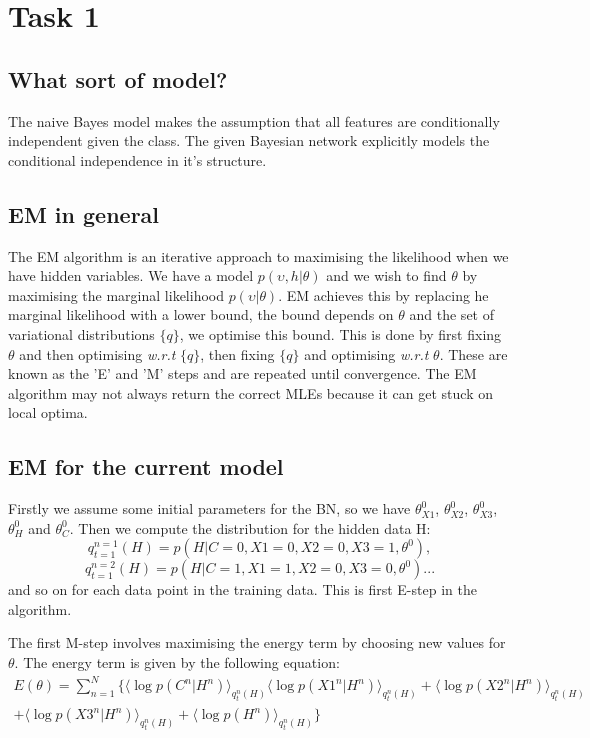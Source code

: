 \documentclass[12pt]{article} %
\begin{document}
\section{Task 1} %


\subsection{What sort of model?} %
The naive Bayes model makes the assumption that all features are conditionally independent given the class. The given Bayesian network explicitly models the conditional independence in it's structure.

\subsection{EM in general}
The EM algorithm is an iterative approach to maximising the likelihood when we have hidden variables. We have a model $p(\upsilon,h|\theta)$ and we wish to find $\theta$ by maximising the marginal likelihood $p(\upsilon|\theta)$. EM achieves this by replacing he marginal likelihood with a lower bound, the bound depends on $\theta$ and the set of variational distributions $\{q\}$, we optimise this bound. This is done by first fixing $\theta$ and then optimising \textit{w.r.t} $\{q\}$, then fixing $\{q\}$ and optimising \textit{w.r.t} $\theta$. These are known as the 'E' and 'M' steps and are repeated until convergence. The EM algorithm may not always return the correct MLEs because it can get stuck on local optima.

\subsection{EM for the current model}
Firstly we assume some initial parameters for the BN, so we have $\theta_{X1}^0$, $\theta_{X2}^0$, $\theta_{X3}^0$, $\theta_{H}^0$ and $\theta_{C}^0$. Then we compute the distribution for the hidden data H:
$$
q_{t=1}^{n=1}(H)=p(H|C=0,X1=0,X2=0,X3=1,\theta^0),
$$
$$
q_{t=1}^{n=2}(H)=p(H|C=1,X1=1,X2=0,X3=0,\theta^0)...
$$
and so on for each data point in the training data. This is first E-step in the algorithm.

The first M-step involves maximising the energy term by choosing new values for $\theta$. The energy term is given by the following equation:
\begin{multline}
E(\theta) = \displaystyle\sum_{n=1}^{N}
\{
\langle\log p(C^n|H^n) \rangle_{q_t^n(H)}
\langle\log p(X1^n|H^n) \rangle_{q_t^n(H)} + 
\langle\log p(X2^n|H^n) \rangle_{q_t^n(H)} \\ +
\langle\log p(X3^n|H^n) \rangle_{q_t^n(H)} + 
\langle\log p(H^n) \rangle_{q_t^n(H)}
\}
\end{multline}
\end{document}
